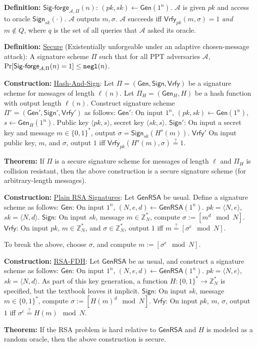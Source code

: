 \documentclass[10pt]{article}
\newcommand{\Z}{\mathbb{Z}}
\newcommand{\AAA}{\mathcal{A}}
\newcommand{\defn}[1]{{\bf Definition:} \underline{#1}}
\newcommand{\thm}[1]{{\bf Theorem:} \underline{#1}}
\newcommand{\con}[1]{{\bf Construction:} \underline{#1}}
\newcommand{\Sign}{\mathsf{Sign}}
\newcommand{\Vrfy}{\mathsf{Vrfy}}
\newcommand{\Gen}{\mathsf{Gen}}
\newcommand{\GenRSA}{\mathsf{GenRSA}}
\newcommand{\ang}[1]{\langle#1\rangle}
\newcommand{\ExptSigF}{\mathsf{Sig\text{-}forge}_{\AAA,\Pi}}
\newcommand{\negl}{{\tt negl}}
\newcommand{\from}{\leftarrow}
\begin{document}
\begin{multicols}{4}
\defn{$\ExptSigF(n)$}: $(pk,sk)\from\Gen(1^n)$. $\AAA$ is given $pk$ and access to oracle $\Sign_{sk}(\cdot)$. $\AAA$ outputs $m,\sigma$. $\AAA$ succeeds iff $\Vrfy_{pk}(m,\sigma)=1$ {\it and} $m\not\in Q$, where $q$ is the set of all queries that $\AAA$ asked its oracle.

\defn{Secure} (Existentially unforgeable under an adaptive chosen-message attack): A signature scheme $\Pi$ such that for all PPT adversaries $\AAA$, $\Pr[\ExptSigF(n)=1]\leq\negl(n)$.

\con{Hash-And-Sign}: Let $\Pi=(\Gen,\Sign,\Vrfy)$ be a signature scheme for messages of length $\ell(n)$. Let $\Pi_{H}=(\Gen_H,H)$ be a hash function with output length $\ell(n)$. Construct signature scheme $\Pi'=(\Gen',\Sign',\Vrfy')$ as follows: $\Gen'$: On input $1^n$, $(pk,sk)\from\Gen(1^n)$, $s\from\Gen_H(1^n)$. Public key $\ang{pk,s}$, secret key $\ang{sk,s}$. $\Sign'$: On input a secret key and message $m\in\{0,1\}^*$, output $\sigma=\Sign_{sk}(H^s(m))$. $\Vrfy'$ On input public key, $m$, and $\sigma$, output $1$ iff $\Vrfy_{pk}(H^s(m),\sigma)\overset{?}{=}1$.

\thm{}If $\Pi$ is a secure signature scheme for messages of length $\ell$ and $\Pi_H$ is collision resistant, then the above construction is a secure signature scheme (for arbitrary-length messages).

\con{Plain RSA Signatures}: Let $\GenRSA$ be usual. Define a signature scheme as follows: $\Gen$: On input $1^n$, $(N,e,d)\from\GenRSA(1^n)$. $pk=\ang{N,e}$, $sk=\ang{N,d}$. $\Sign$: On input $sk$, message $m\in\Z_N^*$, compute $\sigma:=[m^d\mod{N}]$. $\Vrfy$: On input $pk$, $m\in\Z_N^*$, and $\sigma\in\Z_N^*$, output $1$ iff $m\overset{?}{=}[\sigma^e\mod{N}]$.

To break the above, choose $\sigma$, and compute $m:=[\sigma^e\mod{N}]$.

\con{RSA-FDH}: Let $\GenRSA$ be as usual, and construct a signature scheme as follows: $\Gen$: On input $1^n$, $(N,e,d)\from\GenRSA(1^n)$. $pk=\ang{N,e}$, $sk=\ang{N,d}$. As part of this key generation, a function $H:\{0,1\}^*\to\Z_N^*$ is specified, but the textbook leaves it implicit. $\Sign$: On input $sk$, message $m\in\{0,1\}^*$, compute $\sigma:=[H(m)^d\mod{N}]$. $\Vrfy$: On input $pk$, $m$, $\sigma$, output $1$ iff $\sigma^e\overset{?}{=}H(m)\mod{N}$.

\thm{} If the RSA problem is hard relative to $\GenRSA$ and $H$ is modeled as a random oracle, then the above construction is secure.

\end{multicols}
\end{document}
